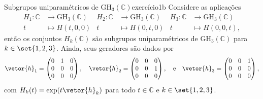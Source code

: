 \begin{proposition}{Subgrupos uniparamétricos de \(\mathrm{GH}_3(\mathbb{C})\)}{exercício1b}
    Considere as aplicações
    \begin{align*}
        H_1 : \mathbb{C} &\to \mathrm{GH}_3(\mathbb{C}) &
        H_2 : \mathbb{C} &\to \mathrm{GH}_3(\mathbb{C}) &
        H_3 : \mathbb{C} &\to \mathrm{GH}_3(\mathbb{C})\\
        t &\mapsto H(t, 0, 0)&
        t &\mapsto H(0, t, 0)&
        t &\mapsto H(0, 0, t),
    \end{align*}
    então os conjuntos \(H_k(\mathbb{C})\) são subgrupos uniparamétricos de \(\mathrm{GH}_3(\mathbb{C})\) para \(k \in \set{1,2,3}\). Ainda, seus geradores são dados por
    \begin{equation*}
        \vetor{h}_1 = \begin{pmatrix}
            0 & 1 & 0\\
            0 & 0 & 0\\
            0 & 0 & 0
        \end{pmatrix},\quad
        \vetor{h}_2 = \begin{pmatrix}
            0 & 0 & 0\\
            0 & 0 & 1\\
            0 & 0 & 0
        \end{pmatrix},\quad\text{e}\quad
        \vetor{h}_3 = \begin{pmatrix}
            0 & 0 & 1\\
            0 & 0 & 0\\
            0 & 0 & 0
        \end{pmatrix},
    \end{equation*}
    com \(H_k(t) = \exp(t\vetor{h}_k)\) para todo \(t \in \mathbb{C}\) e \(k \in \set{1,2,3}\).
\end{proposition}

